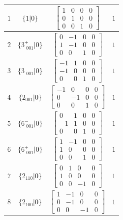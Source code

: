 \documentclass[fleqn,8pt]{jsarticle}
\begin{document}
\begin{longtable}{cccc}
$ 1 $ & $ \{1|0\} $ & $ \begin{bmatrix} 1 & 0 & 0 & 0 \\ 0 & 1 & 0 & 0 \\ 0 & 0 & 1 & 0 \end{bmatrix} $ & $ 1 $ \\ \hline
$ 2 $ & $ \{3^{+}_{\,\,001}|0\} $ & $ \begin{bmatrix} 0 & -1 & 0 & 0 \\ 1 & -1 & 0 & 0 \\ 0 & 0 & 1 & 0 \end{bmatrix} $ & $ 1 $ \\ \hline
$ 3 $ & $ \{3^{-}_{\,\,001}|0\} $ & $ \begin{bmatrix} -1 & 1 & 0 & 0 \\ -1 & 0 & 0 & 0 \\ 0 & 0 & 1 & 0 \end{bmatrix} $ & $ 1 $ \\ \hline
$ 4 $ & $ \{2{}_{001}|0\} $ & $ \begin{bmatrix} -1 & 0 & 0 & 0 \\ 0 & -1 & 0 & 0 \\ 0 & 0 & 1 & 0 \end{bmatrix} $ & $ 1 $ \\ \hline
$ 5 $ & $ \{6^{-}_{\,\,001}|0\} $ & $ \begin{bmatrix} 0 & 1 & 0 & 0 \\ -1 & 1 & 0 & 0 \\ 0 & 0 & 1 & 0 \end{bmatrix} $ & $ 1 $ \\ \hline
$ 6 $ & $ \{6^{+}_{\,\,001}|0\} $ & $ \begin{bmatrix} 1 & -1 & 0 & 0 \\ 1 & 0 & 0 & 0 \\ 0 & 0 & 1 & 0 \end{bmatrix} $ & $ 1 $ \\ \hline
$ 7 $ & $ \{2{}_{110}|0\} $ & $ \begin{bmatrix} 0 & 1 & 0 & 0 \\ 1 & 0 & 0 & 0 \\ 0 & 0 & -1 & 0 \end{bmatrix} $ & $ 1 $ \\ \hline
$ 8 $ & $ \{2{}_{100}|0\} $ & $ \begin{bmatrix} 1 & -1 & 0 & 0 \\ 0 & -1 & 0 & 0 \\ 0 & 0 & -1 & 0 \end{bmatrix} $ & $ 1 $ \\ \hline

\end{longtable}
\end{document}
